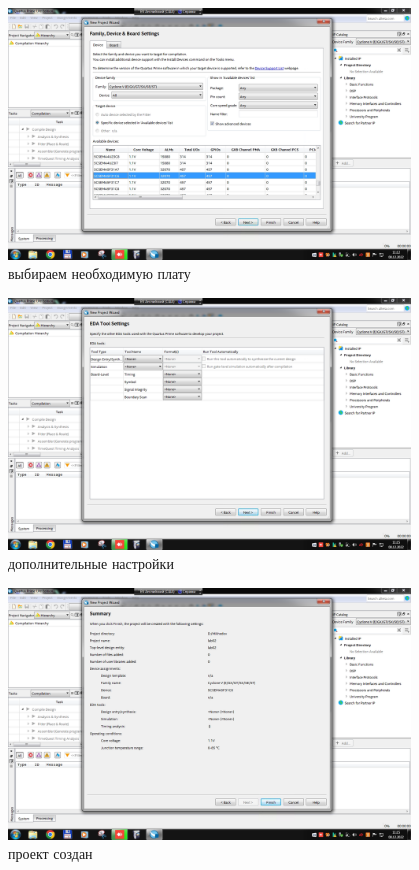 \documentclass[a4paper]{article}
\begin{document}
  \begin{figure}[H]
    \centering
    \includegraphics[width=0.95\textwidth]{02_06}
    \caption{выбираем необходимую плату}
  \end{figure}

  \begin{figure}[H]
    \centering
    \includegraphics[width=0.95\textwidth]{02_07}
    \caption{дополнительные настройки}
  \end{figure}

  \begin{figure}[H]
    \centering
    \includegraphics[width=0.95\textwidth]{02_08}
    \caption{проект создан}
  \end{figure}
\end{document}
